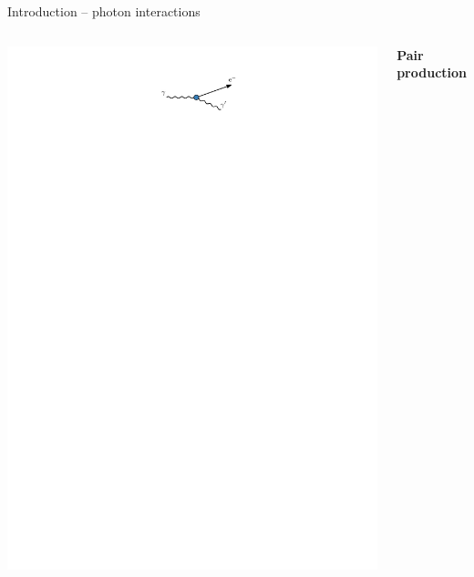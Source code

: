 \documentclass[11pt,xcolor=dvipsnames,professionalfonts]{beamer}
\begin{document}
\begin{frame}{Introduction -- photon interactions}
\begin{columns}
			\includegraphics[width=1.\textwidth]{./figures/compton_intro.pdf}
		
		\pause
		
			\centering
			\textbf{Pair production}
			
			\vspace{.5cm}
			

\end{columns}
\end{frame}
\end{document}
